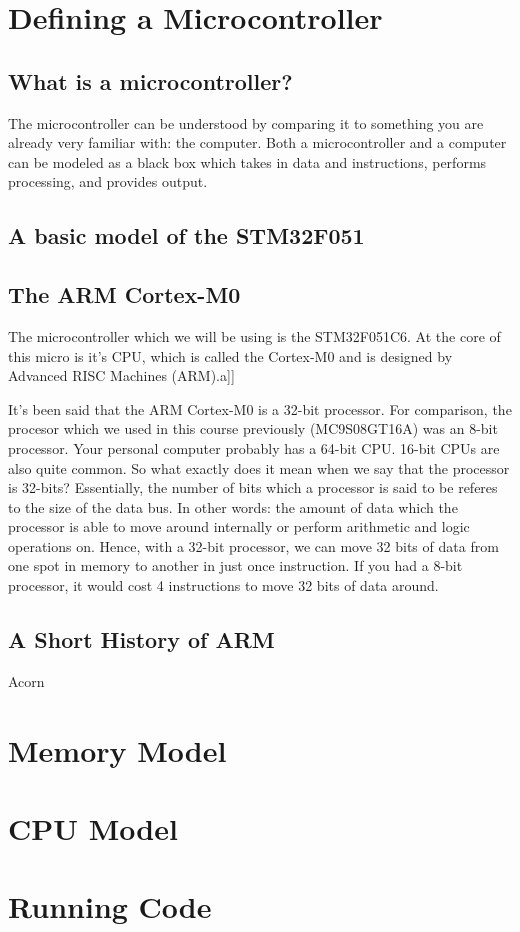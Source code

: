 \section{Defining a Microcontroller}

\subsection{What is a microcontroller?}
The microcontroller can be understood by comparing it to something you are already very familiar with: the computer. Both a microcontroller and a computer can be modeled as a black box which takes in data and instructions, performs processing, and provides output.
\begin{figure}

\end{figure}

\subsection{A basic model of the STM32F051}

\subsection{The ARM Cortex-M0}
The microcontroller which we will be using is the STM32F051C6. At the core of this micro is it's CPU, which is called the Cortex-M0 and is designed by Advanced RISC Machines (ARM).a]]

It's been said that the ARM Cortex-M0 is a 32-bit processor. For comparison, the procesor which we used in this course previously (MC9S08GT16A) was an 8-bit processor. Your personal computer probably has a 64-bit CPU. 16-bit CPUs are also quite common. So what exactly does it mean when we say that the processor is 32-bits? Essentially, the number of bits which a processor is said to be referes to the size of the data bus. In other words: the amount of data which the processor is able to move around internally or perform arithmetic and logic operations on. Hence, with a 32-bit processor, we can move 32 bits of data from one spot in memory to another in just once instruction. If you had a 8-bit processor, it would cost 4 instructions to move 32 bits of data around.  


\subsection{A Short History of ARM}
Acorn

\section{Memory Model}

\section{CPU Model}

\section{Running Code}

